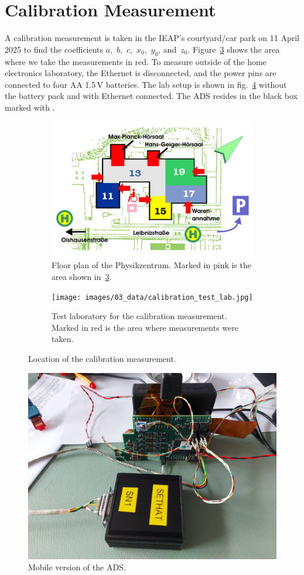 \section{Calibration Measurement \label{sec:da:calibration_meas}}
A calibration measurement is taken in the \ac{IEAP}'s courtyard/car park on 11 April 2025 to find the coefficients $a$,~$b$,~$c$,~$x_0$,~$y_0$, and~$z_0$. Figure~\ref{fig:test_lab} shows the area where we take the measurements in red. To measure outside of the home electronics laboratory, the Ethernet is disconnected, and the power pins are connected to four AA 1.5\,V batteries. The lab setup is shown in fig.~\ref{fig:ads_mobile} without the battery pack and with Ethernet connected. The \ac{ADS} resides in the black box marked with . 

\begin{figure}[h]
    \begin{subfigure}[t]{.5\textwidth}
        \centering
        \includegraphics[width=0.9\linewidth]{images/03_data/lageplan Physikzentrum.png}
        \caption[Floor plan of the Physikzentrum.]{Floor plan of the Physikzentrum. Marked in pink is the area shown in~\ref{fig:test_lab}.}
        \label{fig:lageplan_physikzentrum}
    \end{subfigure}
    \begin{subfigure}[t]{.5\textwidth}
    \centering
    \texttt{[image: images/03\_data/calibration\_test\_lab.jpg]}
    \caption[Test laboratory for the calibration measurement.]{Test laboratory for the calibration measurement. Marked in red is the area where measurements were taken.}
    \label{fig:test_lab}
    \end{subfigure}
    \caption{Location of the calibration measurement.}
\end{figure}

\begin{figure}[h]
    \centering
    \includegraphics[width=0.7\linewidth]{images/03_data/sethat_mobile.jpg}
    \caption{Mobile version of the \ac{ADS}.}
    \label{fig:ads_mobile}
\end{figure}